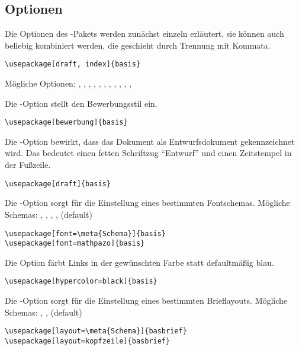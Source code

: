 \subsection{Optionen}
\label{sec:user:options}

Die Optionen des -Pakets werden zunächst einzeln erläutert, sie können
auch beliebig kombiniert werden, die geschieht durch Trennung mit Kommata.

\verb#\usepackage[draft, index]{basis}#

Mögliche Optionen: , , , , , , , , , , , 


Die -Option stellt den Bewerbungsstil ein.

\verb#\usepackage[bewerbung]{basis}#


Die -Option bewirkt, dass das Dokument als Entwurfsdokument gekennzeichnet wird.
Das bedeutet einen fetten Schriftzug "`Entwurf"' und einen Zeitstempel in der Fußzeile.

\verb#\usepackage[draft]{basis}#


Die -Option sorgt für die Einstellung eines bestimmten Fontschemas.
Mögliche Schemas: , , , ,  (default)

\verb#\usepackage[font=\meta{Schema}]{basis}#\\
\verb#\usepackage[font=mathpazo]{basis}#


Die Option  färbt Links in der gewünschten Farbe statt defaultmäßig blau.

\verb#\usepackage[hypercolor=black]{basis}#


Die -Option sorgt für die Einstellung eines bestimmten Brieflayouts.
Mögliche Schemas: , ,  (default)

\verb#\usepackage[layout=\meta{Schema}]{basbrief}#\\
\verb#\usepackage[layout=kopfzeile]{basbrief}#

